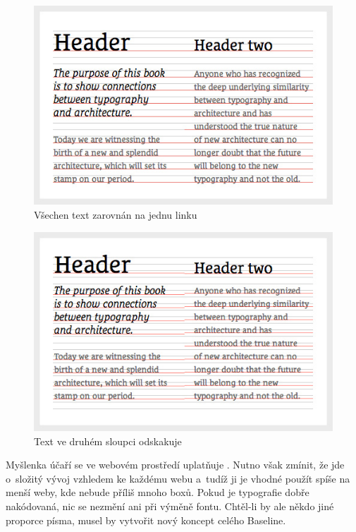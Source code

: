 \documentclass[thesis=B,czech]{FITthesis}[2012/06/26]
\begin{document}
\begin{figure}[h]
	\begin{center}
	\includegraphics[scale=0.6]{images/image10.jpg}
	\end{center}
	\caption[Myšlenka účaří]{Všechen text zarovnán na jednu linku\cite{bas}}
	\label{imgBa1}
\end{figure}
\begin{figure}[h]
	\begin{center}
	\includegraphics[scale=0.6]{images/image17.jpg}
	\end{center}
	\caption[Neuplatněná myšlenka účaří]{Text ve druhém sloupci odskakuje\cite{bas}}
	\label{imgBa2}
\end{figure}


Myšlenka účaří se ve webovém prostředí uplatňuje \cite{bas2}. Nutno však zmínit, že jde o~složitý vývoj vzhledem ke každému webu a~tudíž ji je vhodné použít spíše na menší weby, kde nebude příliš mnoho boxů. Pokud je typografie dobře nakódovaná, nic se nezmění ani při výměně fontu. Chtěl-li by ale někdo jiné proporce písma, musel by vytvořit nový koncept celého Baseline.
\end{document}
